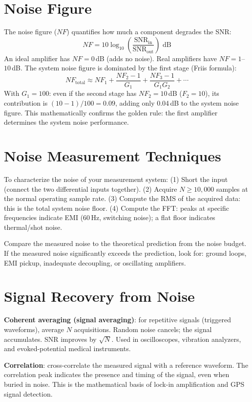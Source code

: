 \documentclass[11pt,letterpaper,twoside,openany]{book}
\begin{document}
\section{Noise Figure}
The noise figure ($NF$) quantifies how much a component degrades the SNR:
\begin{equation}
NF = 10\log_{10}\left(\frac{\text{SNR}_{\text{in}}}{\text{SNR}_{\text{out}}}\right) \text{ dB}
\end{equation}
An ideal amplifier has $NF = 0$\,dB (adds no noise). Real amplifiers have $NF = 1$--$10$\,dB. The system noise figure is dominated by the first stage (Friis formula):
\begin{equation}
NF_{\text{total}} \approx NF_1 + \frac{NF_2 - 1}{G_1} + \frac{NF_3 - 1}{G_1 G_2} + \cdots
\end{equation}
With $G_1 = 100$: even if the second stage has $NF_2 = 10$\,dB ($F_2 = 10$), its contribution is $(10-1)/100 = 0.09$, adding only 0.04\,dB to the system noise figure. This mathematically confirms the golden rule: the first amplifier determines the system noise performance.

\section{Noise Measurement Techniques}
To characterize the noise of your measurement system: (1) Short the input (connect the two differential inputs together). (2) Acquire $N \geq 10{,}000$ samples at the normal operating sample rate. (3) Compute the RMS of the acquired data: this is the total system noise floor. (4) Compute the FFT: peaks at specific frequencies indicate EMI (60\,Hz, switching noise); a flat floor indicates thermal/shot noise.

Compare the measured noise to the theoretical prediction from the noise budget. If the measured noise significantly exceeds the prediction, look for: ground loops, EMI pickup, inadequate decoupling, or oscillating amplifiers.

\section{Signal Recovery from Noise}
\textbf{Coherent averaging (signal averaging)}: for repetitive signals (triggered waveforms), average $N$ acquisitions. Random noise cancels; the signal accumulates. SNR improves by $\sqrt{N}$. Used in oscilloscopes, vibration analyzers, and evoked-potential medical instruments.

\textbf{Correlation}: cross-correlate the measured signal with a reference waveform. The correlation peak indicates the presence and timing of the signal, even when buried in noise. This is the mathematical basis of lock-in amplification and GPS signal detection.
\end{document}

